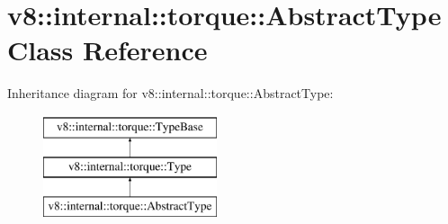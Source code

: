 \hypertarget{classv8_1_1internal_1_1torque_1_1AbstractType}{}\section{v8\+:\+:internal\+:\+:torque\+:\+:Abstract\+Type Class Reference}
\label{classv8_1_1internal_1_1torque_1_1AbstractType}
Inheritance diagram for v8\+:\+:internal\+:\+:torque\+:\+:Abstract\+Type\+:\begin{figure}[H]
\begin{center}
\leavevmode
\includegraphics[height=3.000000cm]{classv8_1_1internal_1_1torque_1_1AbstractType}
\end{center}
\end{figure}

